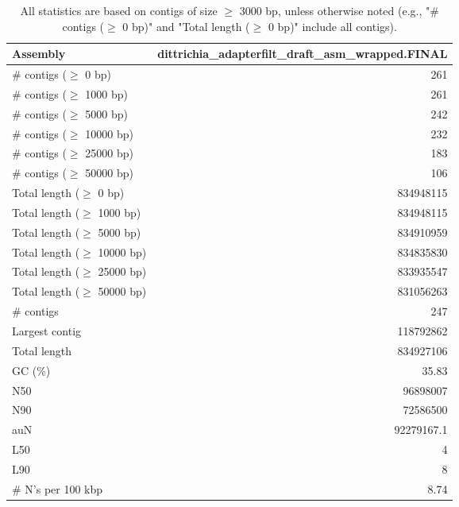 \documentclass[12pt,a4paper]{article}
\begin{document}
\begin{table}[ht]
\begin{center}
\caption{All statistics are based on contigs of size $\geq$ 3000 bp, unless otherwise noted (e.g., "\# contigs ($\geq$ 0 bp)" and "Total length ($\geq$ 0 bp)" include all contigs).}
\begin{tabular}{|l*{1}{|r}|}
\hline
Assembly & dittrichia\_adapterfilt\_draft\_asm\_wrapped.FINAL \\ \hline
\# contigs ($\geq$ 0 bp) & 261 \\ \hline
\# contigs ($\geq$ 1000 bp) & 261 \\ \hline
\# contigs ($\geq$ 5000 bp) & 242 \\ \hline
\# contigs ($\geq$ 10000 bp) & 232 \\ \hline
\# contigs ($\geq$ 25000 bp) & 183 \\ \hline
\# contigs ($\geq$ 50000 bp) & 106 \\ \hline
Total length ($\geq$ 0 bp) & 834948115 \\ \hline
Total length ($\geq$ 1000 bp) & 834948115 \\ \hline
Total length ($\geq$ 5000 bp) & 834910959 \\ \hline
Total length ($\geq$ 10000 bp) & 834835830 \\ \hline
Total length ($\geq$ 25000 bp) & 833935547 \\ \hline
Total length ($\geq$ 50000 bp) & 831056263 \\ \hline
\# contigs & 247 \\ \hline
Largest contig & 118792862 \\ \hline
Total length & 834927106 \\ \hline
GC (\%) & 35.83 \\ \hline
N50 & 96898007 \\ \hline
N90 & 72586500 \\ \hline
auN & 92279167.1 \\ \hline
L50 & 4 \\ \hline
L90 & 8 \\ \hline
\# N's per 100 kbp & 8.74 \\ \hline
\end{tabular}
\end{center}
\end{table}
\end{document}

